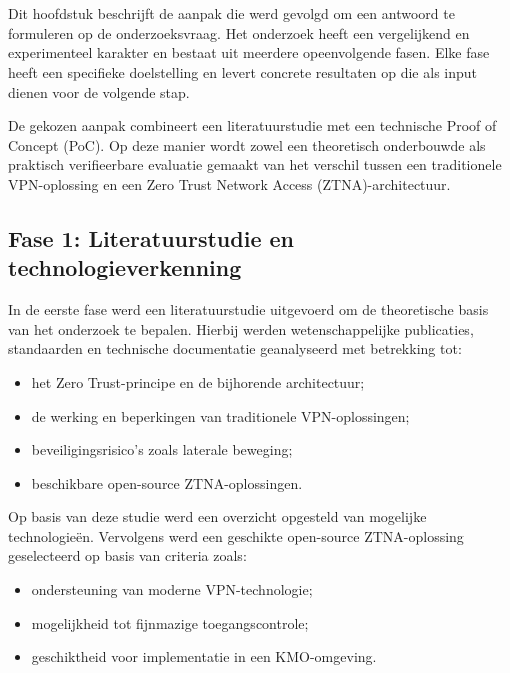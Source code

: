
\chapter{}%
\label{ch:methodologie}

Dit hoofdstuk beschrijft de aanpak die werd gevolgd om een antwoord te formuleren op de onderzoeksvraag. Het onderzoek heeft een vergelijkend en experimenteel karakter en bestaat uit meerdere opeenvolgende fasen. Elke fase heeft een specifieke doelstelling en levert concrete resultaten op die als input dienen voor de volgende stap.

De gekozen aanpak combineert een literatuurstudie met een technische Proof of Concept (PoC). Op deze manier wordt zowel een theoretisch onderbouwde als praktisch verifieerbare evaluatie gemaakt van het verschil tussen een traditionele VPN-oplossing en een Zero Trust Network Access (ZTNA)-architectuur.

\section{Fase 1: Literatuurstudie en technologieverkenning}

In de eerste fase werd een literatuurstudie uitgevoerd om de theoretische basis van het onderzoek te bepalen. Hierbij werden wetenschappelijke publicaties, standaarden en technische documentatie geanalyseerd met betrekking tot:
\begin{itemize}
	\item het Zero Trust-principe en de bijhorende architectuur;
	\item de werking en beperkingen van traditionele VPN-oplossingen;
	\item beveiligingsrisico’s zoals laterale beweging;
	\item beschikbare open-source ZTNA-oplossingen.
\end{itemize}

Op basis van deze studie werd een overzicht opgesteld van mogelijke technologieën. Vervolgens werd een geschikte open-source ZTNA-oplossing geselecteerd op basis van criteria zoals:
\begin{itemize}
	\item ondersteuning van moderne VPN-technologie;
	\item mogelijkheid tot fijnmazige toegangscontrole;
	\item geschiktheid voor implementatie in een KMO-omgeving.
\end{itemize}

